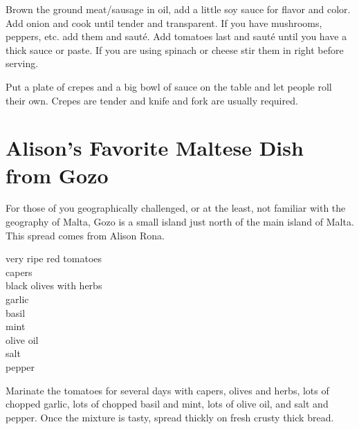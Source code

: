 Brown the ground meat/sausage in oil, add a little soy sauce for flavor and
color. Add onion and cook until tender and transparent. If you have mushrooms,
peppers, etc. add them and saut\'{e}. Add tomatoes last and saut\'{e} until you
have a thick sauce or paste. If you are using spinach or cheese stir them in
right before serving.

Put a plate of crepes and a big bowl of sauce on the table and let people roll
their own. Crepes are tender and knife and fork are usually required.

\section{Alison's Favorite Maltese Dish from Gozo}

\begin{open}
    For those of you geographically challenged, or at the least, not familiar with the geography of Malta, Gozo is a small island just north of the main island of Malta.  This spread comes from Alison Rona.
\end{open}
\begin{ingredients}
    very ripe red tomatoes\\
    capers\\
    black olives with herbs\\
    garlic\\
    basil\\
    mint\\
    olive oil\\
    salt\\
    pepper
\end{ingredients}
Marinate the tomatoes for several days with capers, olives and herbs, lots of chopped garlic, lots of chopped basil and mint, lots of olive oil, and salt and pepper.  Once the mixture is tasty, spread thickly on fresh crusty thick bread.